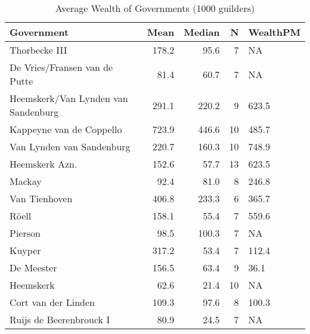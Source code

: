 \begin{table}[ht]
\centering
\begin{tabular}{lrrrl}
  \hline
Government & Mean & Median & N & WealthPM \\ 
  \hline
Thorbecke III & 178.2 & 95.6 &  7 & NA \\ 
  De Vries/Fransen van de Putte & 81.4 & 60.7 &  7 & NA \\ 
  Heemskerk/Van Lynden van Sandenburg & 291.1 & 220.2 &  9 & 623.5 \\ 
  Kappeyne van de Coppello & 723.9 & 446.6 & 10 & 485.7 \\ 
  Van Lynden van Sandenburg & 220.7 & 160.3 & 10 & 748.9 \\ 
  Heemskerk Azn. & 152.6 & 57.7 & 13 & 623.5 \\ 
  Mackay & 92.4 & 81.0 &  8 & 246.8 \\ 
  Van Tienhoven & 406.8 & 233.3 &  6 & 365.7 \\ 
  Röell & 158.1 & 55.4 &  7 & 559.6 \\ 
  Pierson & 98.5 & 100.3 &  7 & NA \\ 
  Kuyper & 317.2 & 53.4 &  7 & 112.4 \\ 
  De Meester & 156.5 & 63.4 &  9 & 36.1 \\ 
  Heemskerk & 62.6 & 21.4 & 10 & NA \\ 
  Cort van der Linden & 109.3 & 97.6 &  8 & 100.3 \\ 
  Ruijs de Beerenbrouck I & 80.9 & 24.5 &  7 & NA \\ 
   \hline
\end{tabular}
\caption{Average Wealth of Governments (1000 guilders)} 
\end{table}
